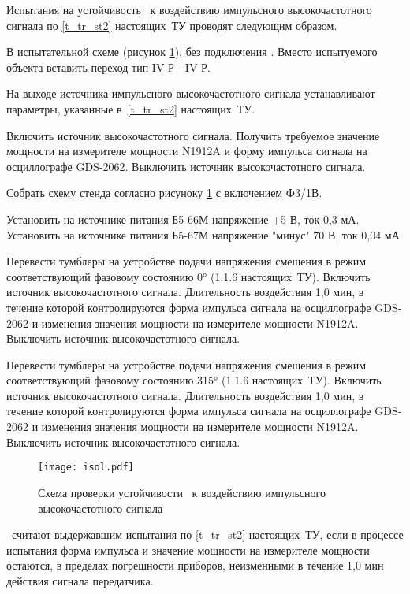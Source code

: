 Испытания на устойчивость \dut \ к воздействию импульсного высокочастотного сигнала по \ref{t_tr_st2}  настоящих~ТУ проводят следующим образом. 


В испытательной схеме (рисунок \ref{fig:ISOL}), без подключения \dut. Вместо испытуемого объекта вставить переход тип IV Р - IV Р.

На выходе источника импульсного высокочастотного сигнала устанавливают параметры, указанные в~\ref{t_tr_st2} настоящих~ТУ. 

Включить источник высокочастотного сигнала. Получить требуемое значение мощности на измерителе мощности N1912A и форму импульса сигнала на осциллографе GDS-2062. Выключить источник высокочастотного сигнала.

Собрать схему стенда согласно рисуноку \ref{fig:ISOL} с включением Ф3/1В.

Установить на источнике питания Б5-66М напряжение +5 В, ток 0,3 мА.
Установить на источнике питания Б5-67М напряжение "минус" 70 В, ток 0,04 мА.

Перевести тумблеры на устройстве подачи напряжения смещения в режим соответствующий фазовому состоянию 0° (1.1.6 настоящих~ТУ).
Включить источник высокочастотного сигнала. Длительность воздействия 1,0 мин, в течение которой контролируются форма импульса сигнала на осциллографе GDS-2062 и изменения значения мощности на измерителе мощности N1912A.
Выключить источник высокочастотного сигнала.

Перевести тумблеры на устройстве подачи напряжения смещения в режим соответствующий фазовому состоянию 315° (1.1.6 настоящих~ТУ).
Включить источник высокочастотного сигнала. Длительность воздействия 1,0 мин, в течение которой контролируются форма импульса сигнала на осциллографе GDS-2062 и изменения значения мощности на измерителе мощности N1912A.
Выключить источник высокочастотного сигнала.


\begin{figure}[ph]
\begin{center}
\texttt{[image: isol.pdf]}
\end{center}

\begin{center}
\caption{Схема проверки устойчивости  \dut \ к воздействию импульсного высокочастотного сигнала }
\label{fig:ISOL}
\end{center}
\end{figure}


\dut \ считают выдержавшим испытания по \ref{t_tr_st2} настоящих~ТУ, если в процессе испытания форма импульса и значение мощности на измерителе мощности остаются, в пределах погрешности приборов, неизменными в течение 1,0 мин действия сигнала передатчика.